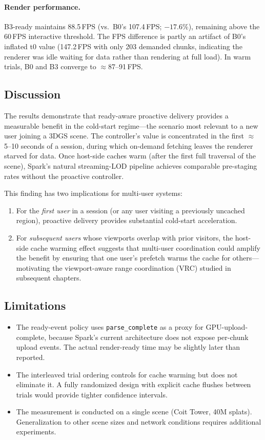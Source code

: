 \paragraph{Render performance.}
B3-ready maintains 88.5\,FPS (vs.\ B0's 107.4\,FPS; $-17.6\%$), remaining
above the 60\,FPS interactive threshold. The FPS difference is partly an
artifact of B0's inflated t0 value (147.2\,FPS with only 203 demanded chunks,
indicating the renderer was idle waiting for data rather than rendering at
full load). In warm trials, B0 and B3 converge to $\approx$87--91\,FPS.

\subsection{Discussion}

The results demonstrate that ready-aware proactive delivery provides a
measurable benefit in the cold-start regime---the scenario most relevant to a
new user joining a 3DGS scene. The controller's value is concentrated in the
first $\approx$5--10 seconds of a session, during which on-demand fetching
leaves the renderer starved for data. Once host-side caches warm (after the
first full traversal of the scene), Spark's natural streaming-LOD pipeline
achieves comparable pre-staging rates without the proactive controller.

This finding has two implications for multi-user systems:
\begin{enumerate}
  \item For the \emph{first user} in a session (or any user visiting a
    previously uncached region), proactive delivery provides substantial
    cold-start acceleration.
  \item For \emph{subsequent users} whose viewports overlap with prior
    visitors, the host-side cache warming effect suggests that multi-user
    coordination could amplify the benefit by ensuring that one user's
    prefetch warms the cache for others---motivating the viewport-aware range
    coordination (VRC) studied in subsequent chapters.
\end{enumerate}

\subsection{Limitations}

\begin{itemize}
  \item The ready-event policy uses \texttt{parse\_complete} as a proxy for
    GPU-upload-complete, because Spark's current architecture does not expose
    per-chunk upload events. The actual render-ready time may be slightly later
    than reported.
  \item The interleaved trial ordering controls for cache warming but does not
    eliminate it. A fully randomized design with explicit cache flushes between
    trials would provide tighter confidence intervals.
  \item The measurement is conducted on a single scene (Coit Tower, 40M
    splats). Generalization to other scene sizes and network conditions
    requires additional experiments.
\end{itemize}

